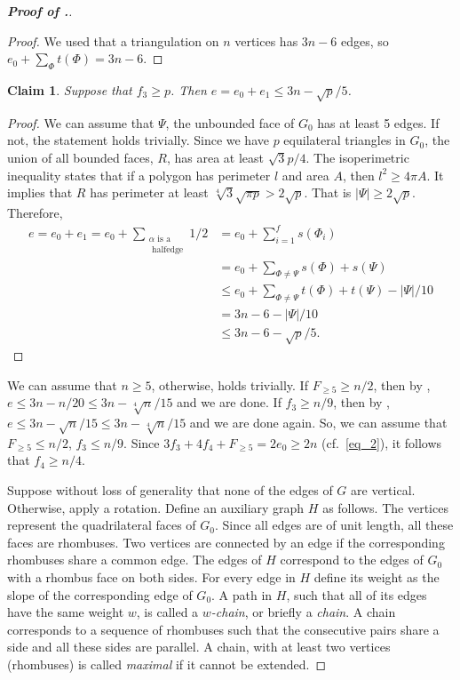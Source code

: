 \documentclass[a4paper,10pt]{article}
\newtheorem{claim}{Claim}
\begin{document}
\begin{proof}[\bf Proof of .]
\begin{proof}
We used that a triangulation on $n$ vertices has $3n-6$ edges, so 
$e_0 + \sum_{\Phi}t(\Phi)=3n-6$.

\end{proof}


\begin{claim} \label{claim:f3}
Suppose that $f_{3}\ge p$. Then 
$e=e_0+e_1\le 3n-\sqrt{p}/5$.
\end{claim}

\begin{proof}
We can assume that $\Psi$, the unbounded face of $G_0$ has at least 5 edges. If not, the statement holds trivially.
Since we have $p$ equilateral triangles in $G_0$, the union of all bounded faces, $R$, has area at least $ \sqrt{3}p/4$.
The isoperimetric inequality \cite{C93} states that if a polygon has perimeter $l$ and area $A$, then $l^2\ge 4\pi A$. It implies that $R$ has perimeter at least $\sqrt[4]{3}\sqrt{\pi p}>2\sqrt{p}$. That is $|\Psi|\ge 2\sqrt{p}$. Therefore,
\begin{align*}
    e=e_0+e_1=e_0+ \sum_{\substack{ \alpha \text{ is a} \\ \text{ halfedge} }} 1/2 &=e_0+\sum_{i=1}^f s(\Phi_i)\\
    &= e_0 + \sum_{\Phi\neq \Psi}s(\Phi) + s(\Psi)\\
    &\le e_0 + \sum_{\Phi\neq \Psi}t(\Phi) + t(\Psi) - |\Psi|/10\\
    &= 3n-6 - |\Psi|/10\\
    &\le 3n-6-\sqrt{p}/5.
\end{align*}
\end{proof}

We can assume that $n \geq 5$, otherwise,  holds trivially. If $F_{\ge 5}\ge n/2$, then by , $e\le 3n-n/20\le 3n-\sqrt[4]{n}/15$ and we are done. If  $f_{3}\ge n/9$, then by , 
$e\le 3n-\sqrt{n}/15 \le 3n-\sqrt[4]{n}/15$ and we are done again. So, we can assume that 
$F_{\ge 5}\le n/2$, $f_{3}\le n/9$. Since $3f_3+4f_4+F_{\ge 5} = 2e_0\ge 2n$ (cf.\ \eqref{eq_2}), it follows that $f_4\ge n/4$. 

\smallskip

Suppose without loss of generality that none of the edges of $G$ are vertical. Otherwise, apply a rotation. Define an auxiliary graph $H$ as follows. The vertices represent the quadrilateral faces of $G_0$. Since all edges are of unit length, all these faces are rhombuses. Two vertices are connected by an edge if the corresponding rhombuses share a common edge. The edges of $H$ correspond to the edges of $G_0$ with a rhombus  face on both sides. For every edge in $H$ define its weight as the slope of the corresponding edge of $G_0$. A path in $H$, such that all of its edges have the same weight $w$, is called a {\em $w$-chain}, or briefly a {\em chain}. A chain corresponds to a sequence of rhombuses such that the consecutive pairs share a side and all these sides are parallel. A chain, with at least two vertices (rhombuses) is called {\em maximal} if it cannot be extended. 


\end{proof}
\end{document}
